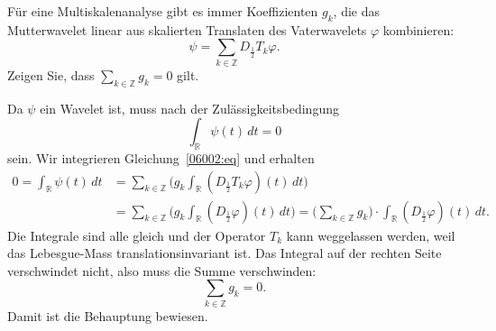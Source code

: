 Für eine Multiskalenanalyse gibt es immer Koeffizienten $g_k$,
die das Mutterwavelet linear aus skalierten Translaten des Vaterwavelets
$\varphi$ kombinieren:
\begin{equation}
\psi = \sum_{k\in\mathbb Z} D_{\frac12}T_k\varphi.
\label{06002:eq}
\end{equation}
Zeigen Sie, dass $\displaystyle\sum_{k\in\mathbb Z} g_k=0$ gilt.

\begin{loesung}
Da $\psi$ ein Wavelet ist, muss nach der Zulässigkeitsbedingung
\[
\int_{\mathbb R}\psi(t)\,dt
=
0
\]
sein.
Wir integrieren Gleichung~\eqref{06002:eq} und erhalten
\begin{align*}
0
=
\int_{\mathbb R}\psi(t)\,dt
&=
\sum_{k\in\mathbb Z} \biggl(g_k\int_{\mathbb R} (D_{\frac12}T_k \varphi)(t)\,dt\biggr)
\\
&=
\sum_{k\in\mathbb Z} \biggl(g_k \int_{\mathbb R} (D_{\frac12}\varphi)(t)\,dt\biggr)
=
\biggl(\sum_{k\in\mathbb Z} g_k\biggr)\cdot
\int_{\mathbb R} (D_{\frac12}\varphi)(t)\,dt.
\end{align*}
Die Integrale sind alle gleich und der Operator $T_k$ kann weggelassen
werden, weil das Lebesgue-Mass translationsinvariant ist.
Das Integral auf der rechten Seite verschwindet nicht, also muss die
Summe verschwinden:
\[
\sum_{k\in\mathbb Z} g_k = 0.
\]
Damit ist die Behauptung bewiesen.
\end{loesung}
